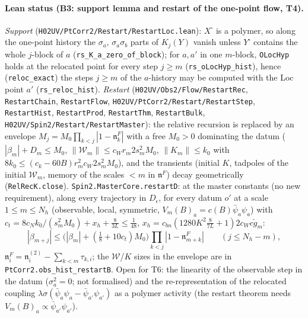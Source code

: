 \documentclass[11pt]{amsart}
\theoremstyle{definition}
\theoremstyle{remark}
\numberwithin{equation}{section}
\begin{document}
\paragraph{Lean status (B3: support lemma and restart of the one-point flow, T4).}
\emph{Support} (\texttt{H02UV/PtCorr2/Restart/RestartLoc.lean}): $X^\square$ is a polymer, so along the one-point history the
$\sigma_a$, $\sigma_a\sigma_b$ parts of $K_j(Y)$ vanish unless $Y^\square$ contains the whole $j$-block of $a$
(\texttt{rs\_K\_a\_zero\_of\_block}); for $a,a'$ in one $m$-block, \texttt{OLocHyp} holds at the relocated
point for every step $j\ge m$ (\texttt{rs\_oLocHyp\_hist}), hence (\texttt{reloc\_exact}) the steps $j\ge m$ of the
$a$-history may be computed with the Loc point $a'$ (\texttt{rs\_reloc\_hist}).
\emph{Restart} (\texttt{H02UV/Obs2/Flow/RestartRec}, \texttt{RestartChain}, \texttt{RestartFlow}, \texttt{H02UV/PtCorr2/Restart/RestartStep},
\texttt{RestartHist}, \texttt{RestartProd}, \texttt{RestartThm}, \texttt{RestartBulk}, \texttt{H02UV/Spin2/Restart/RestartMaster}):
the relative recursion is replaced by an envelope $M_j=M_0\prod_{k<j}|1-\mathfrak n^F_k|$ with a free
$M_0>0$ dominating the datum ($|\beta_m|+D_m\le M_0$, $\|\mathcal W_m\|\le c_Wr_m2s_m^2M_0$,
$\|K_m\|\le k_0$ with $8k_0\le(c_k-60B)r_m^2c_W2s_m^2M_0$), and the transients (initial $K$, tadpoles of the
initial $\mathcal W_m$, memory of the scales $<m$ in $\mathfrak n^F$) decay geometrically
(\texttt{RelRecK.close}). \texttt{Spin2.MasterCore.restartD}: at the master constants (no new requirement), along
every trajectory in $D_\epsilon$, for every datum $o'$ at a scale $1\le m\le N_h$ (observable, local, symmetric,
$V_m(B)_a=c(B)\bar\psi_a\psi_a$) with $c_t=8c_Nk_0/(s_m^2M_0)+x_h+\frac{8}{3L}\le\frac1{48}$,
$x_h=c_{bn}(1280K^2\frac8{7L}+1)2c_Wc\check g_m$:
\[
  |\beta_{m+j}|\le\bigl(|\beta_m|+(\tfrac18+10c_t)M_0\bigr)\prod_{k<j}|1-\mathfrak n^F_{m+k}|\qquad(j\le N_h-m),
\]
$\mathfrak n^F_i=\mathfrak n^{(2)}_i-\sum_{k<m}\tau_{k,i}$; the $\mathcal W$/$K$ sizes in the envelope are in
\texttt{PtCorr2.obs\_hist\_restartB}. Open for T6: the linearity of the observable step in the datum
($\sigma_a^2=0$; not formalised) and the re-representation of the relocated coupling
$\lambda\sigma(\bar\psi_a\psi_a-\bar\psi_{a'}\psi_{a'})$ as a polymer activity (the restart theorem needs
$V_m(B)_a\propto\bar\psi_{a'}\psi_{a'}$).
\end{document}
